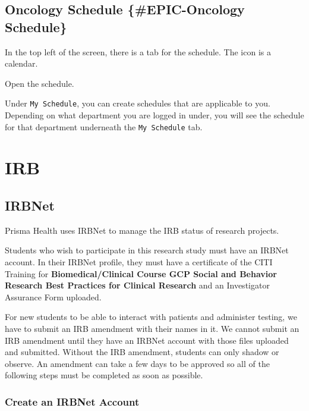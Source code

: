 \documentclass[
]{book}
\begin{document}
\hypertarget{oncology-schedule-epic-oncology-schedule}{%
\section{Oncology Schedule \{\#EPIC-Oncology Schedule\}}\label{oncology-schedule-epic-oncology-schedule}}

In the top left of the screen, there is a tab for the schedule. The icon is a calendar.

Open the schedule.

Under \texttt{My\ Schedule}, you can create schedules that are applicable to you. Depending on what department you are logged in under, you will see the schedule for that department underneath the \texttt{My\ Schedule} tab.

\hypertarget{IRB}{%
\chapter{IRB}\label{IRB}}

\hypertarget{IRBNet}{%
\section{IRBNet}\label{IRBNet}}

Prisma Health uses IRBNet to manage the IRB status of research projects.

Students who wish to participate in this research study must have an IRBNet account. In their IRBNet profile, they must have a certificate of the CITI Training for \textbf{Biomedical/Clinical Course GCP Social and Behavior Research Best Practices for Clinical Research} and an Investigator Assurance Form uploaded.

For new students to be able to interact with patients and administer testing, we have to submit an IRB amendment with their names in it. We cannot submit an IRB amendment until they have an IRBNet account with those files uploaded and submitted. Without the IRB amendment, students can only shadow or observe. An amendment can take a few days to be approved so all of the following steps must be completed as soon as possible.

\hypertarget{CreateIRBNetAccount}{%
\subsection{Create an IRBNet Account}\label{CreateIRBNetAccount}}
\end{document}
